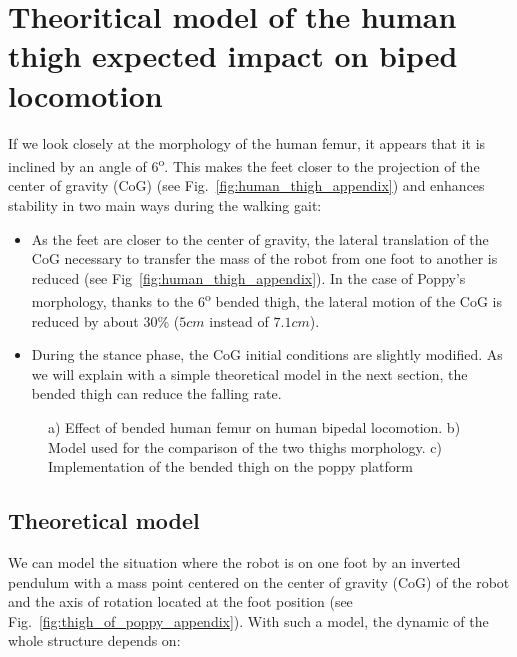\chapter{Theoritical model of the human thigh expected impact on biped locomotion} %
\label{appendix:thigh_model}



If we look closely at the morphology of the human femur, it appears that it is inclined by an angle of 6\textsuperscript{o}. This makes the feet closer to the projection of the center of gravity (CoG) (see Fig.~\ref{fig:human_thigh_appendix}) and enhances stability  in  two main ways  during the walking gait:

\begin{itemize}
    \item As the feet are closer to the center of gravity, the lateral translation of the CoG necessary to transfer the mass of the robot from one foot to another is reduced (see Fig~\ref{fig:human_thigh_appendix}). In the case of Poppy's morphology, thanks to the $6$\textsuperscript{o} bended thigh, the lateral motion of the CoG is reduced by about 30\% ($ 5 cm$ instead of $7.1 cm$).
    \item During the stance phase, the CoG initial conditions are slightly modified. As we will explain with a simple theoretical model in the next section, the bended thigh can reduce the falling rate.
\end{itemize}


\begin{figure}[tb]
\centering
    \hfil
    \hfil
    \caption{ a) Effect of bended human femur on human bipedal locomotion.
    b) Model used for the comparison of the two thighs morphology.
    c) Implementation of the bended thigh on the poppy platform}
    \label{fig:poppy_thigh_appendix}
\end{figure}

\section{Theoretical model} %
\label{sub:exp_theoritical_model}

We can model the situation where the robot is on one foot by an inverted pendulum with a mass point centered on the center of gravity (CoG) of the robot and the axis of rotation located at the foot position (see Fig.~\ref{fig:thigh_of_poppy_appendix}). With such a model, the dynamic of the whole structure depends on:

